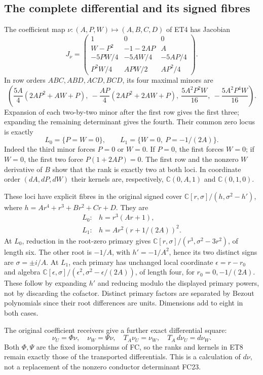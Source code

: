 \documentclass[11pt]{article}
\begin{document}
\subsection{The complete differential and its signed fibres}
The coefficient map $\nu:(A,P,W)\mapsto(A,B,C,D)$ of ET4 has Jacobian
\[
 J_\nu=\begin{pmatrix}
 1&0&0\\
 W-P^2&-1-2AP&A\\
 -5PW/4&-5AW/4&-5AP/4\\
 P^2W/4&APW/2&AP^2/4
 \end{pmatrix}.
 \tag{ET6}
\]
In row orders $ABC,ABD,ACD,BCD$, its four maximal minors are
\[
 \left(
 \frac{5A}{4}(2AP^2+AW+P),\
 -\frac{AP}{4}(2AP^2+2AW+P),\
 \frac{5A^2P^2W}{16},\
 -\frac{5A^2P^4W}{16}
 \right).
 \tag{ET7}
\]
Expansion of each two-by-two minor after the first row gives the first
three; expanding the remaining determinant gives the fourth.
Their common zero locus is exactly
\[
 L_0=\{P=W=0\},\qquad
 L_1=\{W=0,\ P=-1/(2A)\}.
 \tag{ET8}
\]
Indeed the third minor forces $P=0$ or $W=0$.
If $P=0$, the first forces $W=0$; if $W=0$, the first two force
$P(1+2AP)=0$. The first row and the nonzero $W$ derivative of $B$
show that the rank is exactly two at both loci.
In coordinate order $(dA,dP,dW)$ their kernels are, respectively,
$\mathbb C(0,A,1)$ and $\mathbb C(0,1,0)$.

These loci have explicit fibres in the original signed cover
$\mathbb C[r,\sigma]/(h,\sigma^2-h')$, where
$h=Ar^4+r^3+Br^2+Cr+D$. They are
\[
 \begin{array}{ll}
 L_0:&h=r^3(Ar+1),\\[2pt]
 L_1:&h=Ar^2(r+1/(2A))^2 .
 \end{array}
 \tag{ET9}
\]
At $L_0$, reduction in the root-zero primary gives
$\mathbb C[r,\sigma]/(r^3,\sigma^2-3r^2)$, of length six.
The other root is $-1/A$, with $h'=-1/A^2$, hence its two
distinct signs are $\sigma=\pm i/A$. At $L_1$, each primary
has unchanged local coordinate $\epsilon=r-r_0$ and algebra
$\mathbb C[\epsilon,\sigma]/(\epsilon^2,\sigma^2-\epsilon/(2A))$,
of length four, for $r_0=0,-1/(2A)$. These follow by expanding $h'$
and reducing modulo the displayed primary powers, not by discarding
the cofactor. Distinct primary factors are separated by Bezout
polynomials since their root differences are units. Dimensions add
to eight in both cases.

The original coefficient receivers give a further exact differential
square:
\[
 \nu_U=\Phi\nu,\quad \nu_W=\Psi\nu,\quad
 T_A\nu_U=\nu_W,\quad T_A\,d\nu_U=d\nu_W .
 \tag{ET10}
\]
Both $\Phi,\Psi$ are the fixed isomorphisms of FC, so the ranks and
kernels in ET8 remain exactly those of the transported differentials.
This is a calculation of $d\nu$, not a replacement of the nonzero
conductor determinant FC23.
\end{document}
